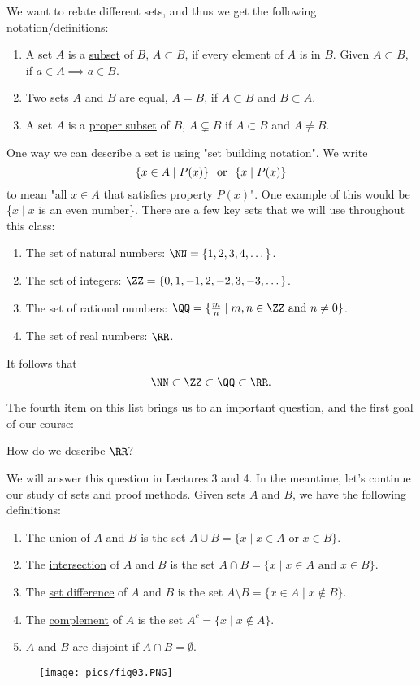 \begin{definition}
We want to relate different sets, and thus we get the following notation/definitions:
\begin{enumerate}
    \item A set $A$ is a \underline{subset} of $B$, $A\subset B$, if every element of $A$ is in $B.$ Given $A\subset B$, if $a\in A\implies a\in B$.
    \item Two sets $A$ and $B$ are \underline{equal}, $A=B$, if $A\subset B$ and $B\subset A$.
    \item A set $A$ is a \underline{proper subset} of $B$, $A\subsetneq B$ if $A\subset B$ and $A\neq B$. 
\end{enumerate}
\end{definition}

One way we can describe a set is using "set building notation". We write
\[
\{x\in A\mid P(x)\} \hspace{.25cm} \text{or} \hspace{.25cm} \{x\mid P(x)\}
\]
to mean "all $x\in A$ that satisfies property $P(x)$". One example of this would be \{$x\mid x$ is an even number\}. There are a few key sets that we will use throughout this class: 
\begin{enumerate}
    \item The set of natural numbers: $\NN = \{1,2,3,4,\dots\}$.
    \item The set of integers: $\ZZ = \{0, 1, -1, 2, -2, 3, -3, \dots\}$.
    \item The set of rational numbers: $\QQ = \{\frac{m}{n} \mid m,n\in \ZZ \text{~and~} n\neq 0\}$. 
    \item The set of real numbers: $\RR$.
\end{enumerate}
It follows that 
\[
\NN \subset \ZZ\subset \QQ \subset \RR.
\]

\noindent The fourth item on this list brings us to an important question, and the first goal of our course:
\begin{problem}
How do we describe $\RR$?
\end{problem}
We will answer this question in Lectures 3 and 4. %
In the meantime, let's continue our study of sets and proof methods. Given sets $A$ and $B$, we have the following definitions:
\begin{enumerate}
    \item The \underline{union} of $A$ and $B$ is the set
    $A\cup B = \{x\mid x\in A \text{~or~} x\in B\}.$
    \item The \underline{intersection} of $A$ and $B$ is the set
    $A\cap B = \{x\mid x\in A \text{~and~} x\in B\}.$
    \item The \underline{set difference} of $A$ and $B$ is the set
    $A\setminus B = \{x\in A \mid x\notin B\}.$
    \item The \underline{complement} of $A$ is the set $A^c = \{x \mid x\notin A\}$. 
    \item $A$ and $B$ are \underline{disjoint} if $A\cap B = \emptyset$.
\end{enumerate}
\begin{figure}[h]
    \centering
    \texttt{[image: pics/fig03.PNG]}
\end{figure}

